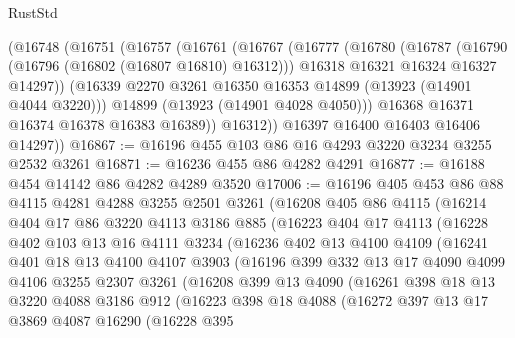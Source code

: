 \begin{lexlean}{RustStd}
\begin{coremodule}
{\begin{coremodule}
{{{{{{{{{{{{{{{{{{{{{{{{{{{{{{{{{{{{{      (@16748
        (@16751
          (@16757
            (@16761
              (@16767
                (@16777
                  (@16780
                    (@16787
                      (@16790 (@16796 (@16802 (@16807 @16810) @16312)))
                      @16318
                      @16321
                      @16324
                      @16327
                      @14297))
                  (@16339 @2270 @3261 @16350 @16353 @14899 (@13923 (@14901 @4044 @3220)))
                  @14899
                  (@13923 (@14901 @4028 @4050)))
                @16368
                @16371
                @16374
                @16378
                @16383
                @16389))
            @16312))
        @16397
        @16400
        @16403
        @16406
        @14297))
@16867 := @16196 @455 @103 @86 @16 @4293 @3220 @3234 @3255 @2532 @3261
@16871 := @16236 @455 @86 @4282 @4291
@16877 := @16188 @454 @14142 @86 @4282 @4289 @3520
@17006 := @16196
    @405
    @453
    @86
    @88
    @4115
    @4281
    @4288
    @3255
    @2501
    @3261
    (@16208
      @405
      @86
      @4115
      (@16214
        @404
        @17
        @86
        @3220
        @4113
        @3186
        @885
        (@16223
          @404
          @17
          @4113
          (@16228
            @402
            @103
            @13
            @16
            @4111
            @3234
            (@16236
              @402
              @13
              @4100
              @4109
              (@16241
                @401
                @18
                @13
                @4100
                @4107
                @3903
                (@16196
                  @399
                  @332
                  @13
                  @17
                  @4090
                  @4099
                  @4106
                  @3255
                  @2307
                  @3261
                  (@16208
                    @399
                    @13
                    @4090
                    (@16261
                      @398
                      @18
                      @13
                      @3220
                      @4088
                      @3186
                      @912
                      (@16223
                        @398
                        @18
                        @4088
                        (@16272
                          @397
                          @13
                          @17
                          @3869
                          @4087
                          @16290
                          (@16228
                            @395
}}}}}}}}}}}}}}}}}}}}}}}}}}}}}}}}}}}}}
\end{coremodule}}
\end{coremodule}
\end{lexlean}
